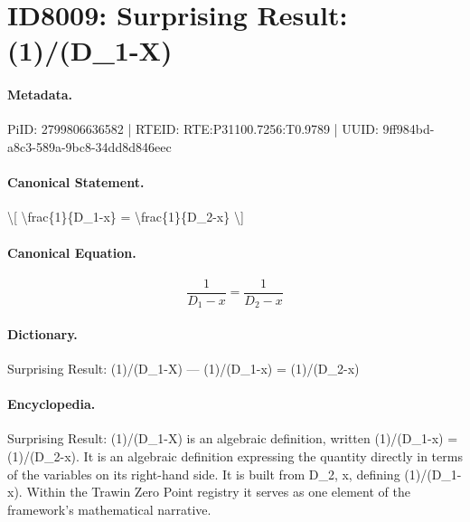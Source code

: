 \section*{ID8009: Surprising Result: (1)/(D\_1-X)}
\paragraph{Metadata.}
PiID: 2799806636582 | RTEID: RTE:P31100.7256:T0.9789 | UUID: 9ff984bd-a8c3-589a-9bc8-34dd8d846eec

\paragraph{Canonical Statement.}
\textbackslash{}[ \textbackslash{}frac\{1\}\{D\_1-x\} = \textbackslash{}frac\{1\}\{D\_2-x\} \textbackslash{}]

\paragraph{Canonical Equation.}
\[
\frac{1}{D_1-x} = \frac{1}{D_2-x}
\]

\paragraph{Dictionary.}
Surprising Result: (1)/(D\_1-X) — (1)/(D\_1-x) = (1)/(D\_2-x)

\paragraph{Encyclopedia.}
Surprising Result: (1)/(D\_1-X) is an algebraic definition, written (1)/(D\_1-x) = (1)/(D\_2-x). It is an algebraic definition expressing the quantity directly in terms of the variables on its right-hand side. It is built from D\_2, x, defining (1)/(D\_1-x). Within the Trawin Zero Point registry it serves as one element of the framework's mathematical narrative.
